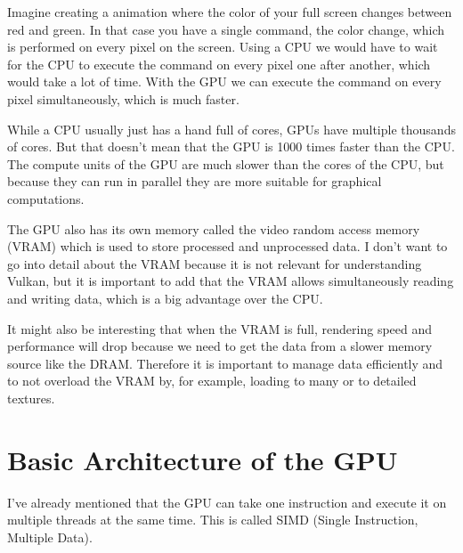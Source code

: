 \documentclass[12pt]{report} \usepackage{preamble}
\begin{document}
Imagine creating a animation where the color of your full screen changes
between red and green. In that case you have a single command, the color
change, which is performed on every pixel on the screen. Using a CPU
we would have to wait for the CPU to execute the command on every pixel
one after another, which would take a lot of time. With the GPU we can
execute the command on every pixel simultaneously, which is much faster.

While a CPU usually just has a hand full of cores, GPUs have multiple
thousands of cores. \cite{NVIDIA-rtx-4090}
But that doesn't mean that the GPU is 1000
times faster than the CPU. The compute units of the GPU are much slower
than the cores of the CPU, but because they can run in parallel they are
more suitable for graphical computations. \cite{CUDA_Programming_Guide}

The GPU also has its own memory called the video random access memory
(VRAM) which is used to store processed and unprocessed data.
I don't want to go into detail about the VRAM because it is not relevant
for understanding Vulkan, but it is important to add that the VRAM
allows simultaneously reading and writing data, which is a big advantage
over the CPU. \cite{vram}

It might also be interesting that when the VRAM is full, rendering
speed and performance will drop because we need to get the data from a
slower memory source like the DRAM.  Therefore it is important to manage
data efficiently and to not overload the VRAM by, for example, loading
to many or to detailed textures.

\section{Basic Architecture of the GPU}

I've already mentioned that the GPU can take one instruction and
execute it on multiple threads at the same time. This is called SIMD
(Single Instruction, Multiple Data). \cite{cherry_gpu_architecture}
\end{document}
